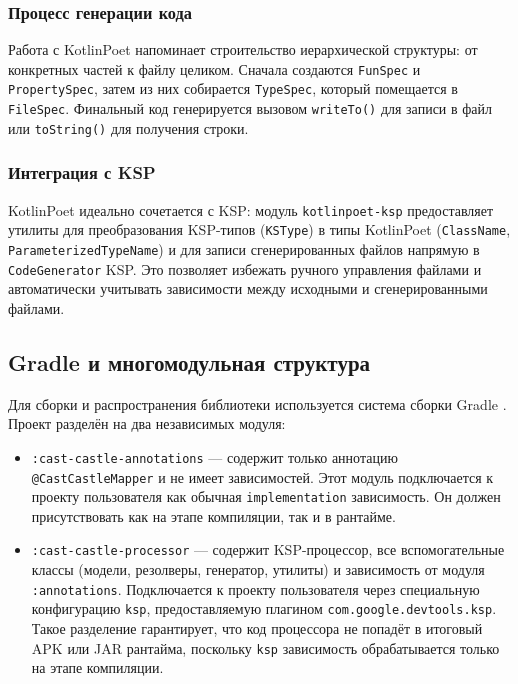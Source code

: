 \subsubsection{Процесс генерации кода}

Работа с KotlinPoet напоминает строительство иерархической структуры: от конкретных частей к файлу целиком. Сначала создаются \texttt{FunSpec} и \texttt{PropertySpec}, затем из них собирается \texttt{TypeSpec}, который помещается в \texttt{FileSpec}. Финальный код генерируется вызовом \texttt{writeTo()} для записи в файл или \texttt{toString()} для получения строки.

\subsubsection{Интеграция с KSP}

KotlinPoet идеально сочетается с KSP: модуль \texttt{kotlinpoet-ksp} предоставляет утилиты для преобразования KSP-типов (\texttt{KSType}) в типы KotlinPoet (\texttt{ClassName}, \texttt{ParameterizedTypeName}) и для записи сгенерированных файлов напрямую в \texttt{CodeGenerator} KSP. Это позволяет избежать ручного управления файлами и автоматически учитывать зависимости между исходными и сгенерированными файлами.

\subsection{Gradle и многомодульная структура}

Для сборки и распространения библиотеки используется система сборки Gradle \cite{refm}. Проект разделён на два независимых модуля:

\begin{itemize}
    \item \texttt{:cast-castle-annotations} — содержит только аннотацию \texttt{@CastCastleMapper} и не имеет зависимостей. Этот модуль подключается к проекту пользователя как обычная \texttt{implementation} зависимость. Он должен присутствовать как на этапе компиляции, так и в рантайме.
    \item \texttt{:cast-castle-processor} — содержит KSP-процессор, все вспомогательные классы (модели, резолверы, генератор, утилиты) и зависимость от модуля \texttt{:annotations}. Подключается к проекту пользователя через специальную конфигурацию \texttt{ksp}, предоставляемую плагином \texttt{com.google.devtools.ksp}. Такое разделение гарантирует, что код процессора не попадёт в итоговый APK или JAR рантайма, поскольку \texttt{ksp} зависимость обрабатывается только на этапе компиляции.
\end{itemize}

